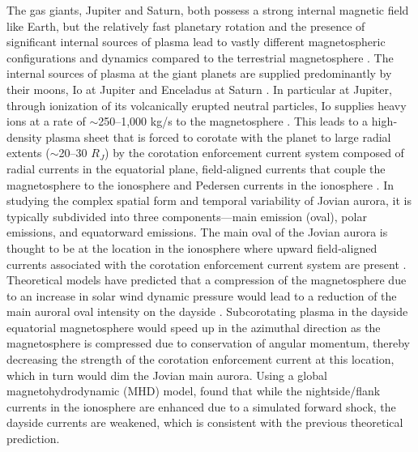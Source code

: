 The gas giants, Jupiter and Saturn, both possess a strong internal magnetic field like Earth, but the relatively fast planetary rotation and the presence of significant internal sources of plasma lead to vastly different magnetospheric configurations and dynamics compared to the terrestrial magnetosphere \cite{Khurana2004a,Krupp2004DynamicsMagnetosphere}. The internal sources of plasma at the giant planets are supplied predominantly by their moons, Io at Jupiter \cite{Bolton2015a} and Enceladus at Saturn \cite{Blanc2015}. In particular at Jupiter, through ionization of its volcanically erupted neutral particles, Io supplies heavy ions at a rate of $\sim$250–1,000 kg/s to the magnetosphere \cite{Bagenal2011b}. This leads to a high‐density plasma sheet that is forced to corotate with the planet to large radial extents ($\sim$20–30 $R_J$) by the corotation enforcement current system composed of radial currents in the equatorial plane, field‐aligned currents that couple the magnetosphere to the ionosphere and Pedersen currents in the ionosphere \cite{Cowley2003a,Cowley2001a,Hill1979,Hill1980,Hill2001,Vasyliunas1983a}. In studying the complex spatial form and temporal variability of Jovian aurora, it is typically subdivided into three components—main emission (oval), polar emissions, and equatorward emissions. The main oval of the Jovian aurora is thought to be at the location in the ionosphere where upward field‐aligned currents associated with the corotation enforcement current system are present \cite{Cowley2001a,Hill2001,Southwood2001a}. Theoretical models have predicted that a compression of the magnetosphere due to an increase in solar wind dynamic pressure would lead to a reduction of the main auroral oval intensity on the dayside \cite{Cowley2003a,Cowley2007,Southwood2001a}. Subcorotating plasma in the dayside equatorial magnetosphere would speed up in the azimuthal direction as the magnetosphere is compressed due to conservation of angular momentum, thereby decreasing the strength of the corotation enforcement current at this location, which in turn would dim the Jovian main aurora. Using a global magnetohydrodynamic (MHD) model,  found that while the nightside/flank currents in the ionosphere are enhanced due to a simulated forward shock, the dayside currents are weakened, which is consistent with the previous theoretical prediction. 

